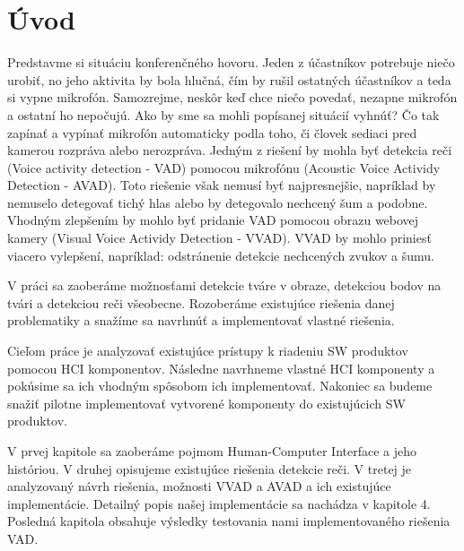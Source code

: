 \chapter*{Úvod}

Predstavme si situáciu konferenčného hovoru. 
Jeden z účastníkov potrebuje niečo urobiť, no jeho aktivita by bola hlučná, čím by rušil ostatných účastníkov a teda si vypne mikrofón. 
Samozrejme, neskôr keď chce niečo povedať, nezapne mikrofón a ostatní ho nepočujú.
Ako by sme sa mohli popísanej situácií vyhnúť? 
Čo tak zapínať a vypínať mikrofón automaticky podla toho, či človek sediaci pred kamerou rozpráva alebo nerozpráva.
Jedným z riešení by mohla byť detekcia reči (Voice activity detection - VAD) pomocou mikrofónu (Acoustic Voice Actividy Detection - AVAD).
Toto riešenie však nemusí byť najpresnejšie, napríklad by nemuselo detegovať tichý hlas alebo by detegovalo nechcený šum a podobne.
Vhodným zlepšením by mohlo byť pridanie VAD pomocou obrazu webovej kamery (Visual Voice Actividy Detection - VVAD).
VVAD by mohlo priniesť viacero vylepšení, napríklad: odstránenie detekcie nechcených zvukov a šumu.

V práci sa zaoberáme možnosťami detekcie tváre v obraze, detekciou bodov na tvári a detekciou reči všeobecne. 
Rozoberáme existujúce riešenia danej problematiky a snažíme sa navrhnúť a implementovať vlastné riešenia.

Cieľom práce je analyzovať existujúce prístupy k riadeniu SW produktov pomocou HCI komponentov. 
Následne navrhneme vlastné HCI komponenty a pokúsime sa ich vhodným spôsobom ich implementovať.
Nakoniec sa budeme snažiť pilotne implementovať vytvorené komponenty do existujúcich SW produktov.

V prvej kapitole sa zaoberáme pojmom Human-Computer Interface a jeho históriou.
V druhej opisujeme existujúce riešenia detekcie reči.
V tretej je analyzovaný návrh riešenia, možnosti VVAD a AVAD a ich existujúce implementácie.
Detailný popis našej implementácie sa nachádza v kapitole 4.
Posledná kapitola obsahuje výsledky testovania nami implementovaného riešenia VAD.